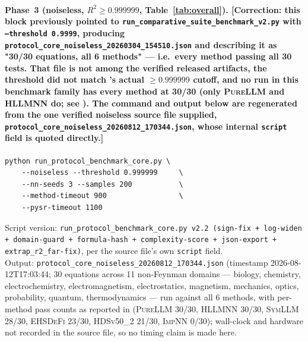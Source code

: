 \documentclass[twoside,11pt]{article}
\newcommand{\PureLLM}{\textsc{PureLLM}}
\newcommand{\INN}{\textsc{ImpNN}}
\newcommand{\EHD}{\textsc{EHSDeFi}}
\newcommand{\HSL}{\textsc{HLLMNN}}
\newcommand{\SEL}{\textsc{SymLLM}}
\newcommand{\HDS}{\textsc{HDSv50\_2}}
\begin{document}
\paragraph{Phase~3 (noiseless, $R^2\geq0.999999$, Table~\ref{tab:overall}).
\textbf{[Correction: this block previously pointed to
\texttt{run\_comparative\_suite\_benchmark\_v2.py} with
\texttt{--threshold 0.9999}, producing
\texttt{protocol\_core\_noiseless\_20260304\_154510.json} and describing it
as "30/30 equations, all 6 methods" --- i.e.\ every method passing all 30
tests. That file is not among the verified released artifacts, the
threshold did not match 's actual $\geq0.999999$ cutoff,
and no run in this benchmark family has every method at 30/30 (only
\PureLLM{} and \HSL{} do; see ). The command and output
below are regenerated from the one verified noiseless source file supplied,
\texttt{protocol\_core\_noiseless\_20260812\_170344.json}, whose internal
\texttt{script} field is quoted directly.]}}
\begin{verbatim}
python run_protocol_benchmark_core.py \
    --noiseless --threshold 0.999999     \
    --nn-seeds 3 --samples 200           \
    --method-timeout 900                 \
    --pysr-timeout 1100
\end{verbatim}
Script version: \texttt{run\_protocol\_benchmark\_core.py v2.2 (sign-fix +
log-widen + domain-guard + formula-hash + complexity-score + json-export +
extrap\_r2\_far-fix)}, per the source file's own \texttt{script} field.\\
Output: \texttt{protocol\_core\_noiseless\_20260812\_170344.json}
(timestamp 2026-08-12T17:03:44; 30 equations across 11 non-Feynman domains
--- biology, chemistry, electrochemistry, electromagnetism, electrostatics,
magnetism, mechanics, optics, probability, quantum, thermodynamics --- run
against all 6 methods, with per-method pass counts as reported in
\Cref{tab:overall} (\PureLLM{} 30/30, \HSL{} 30/30, \SEL{} 28/30, \EHD{}
23/30, \HDS{} 21/30, \INN{} 0/30); wall-clock and hardware not recorded in
the source file, so no timing claim is made here.
\end{document}
